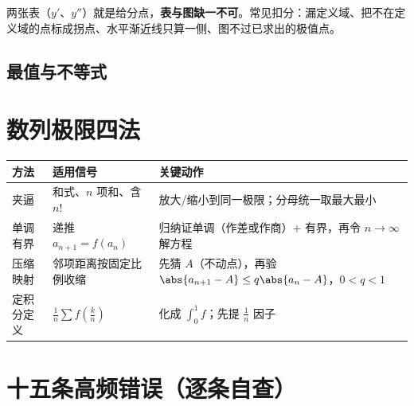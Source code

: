 \documentclass[UTF8,11pt]{ctexart}
\begin{document}
\begin{warnbox}[作图给分点]
两张表（$y'$、$y''$）就是给分点，\textbf{表与图缺一不可}。常见扣分：漏定义域、把不在定义域的点标成拐点、水平渐近线只算一侧、图不过已求出的极值点。
\end{warnbox}

\subsection{最值与不等式}


\section{数列极限四法}

\begin{center}
\renewcommand{\arraystretch}{1.2}
\begin{tabular}{@{}p{2.6cm}p{5.6cm}p{6.4cm}@{}}
\toprule
\textbf{方法} & \textbf{适用信号} & \textbf{关键动作} \\
\midrule
夹逼 & 和式、$n$ 项和、含 $n!$ & 放大/缩小到同一极限；分母统一取最大最小 \\
单调有界 & 递推 $a_{n+1}=f(a_n)$ & 归纳证单调（作差或作商）+ 有界，再令 $n\to\infty$ 解方程 \\
压缩映射 & 邻项距离按固定比例收缩 & 先猜 $A$（不动点），再验 $\abs{a_{n+1}-A}\le q\abs{a_n-A}$，$0<q<1$ \\
定积分定义 & $\frac1n\sum f(\frac{k}{n})$ & 化成 $\int_0^1f$；先提 $\frac1n$ 因子 \\
\bottomrule
\end{tabular}
\end{center}


\section{十五条高频错误（逐条自查）}
\end{document}
